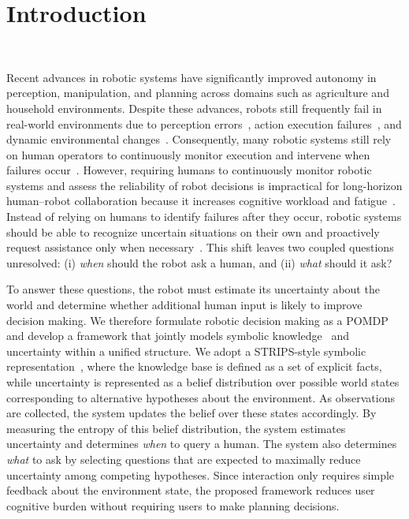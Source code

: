 \section{Introduction}~\label{sec:introduction}

Recent advances in robotic systems have significantly improved autonomy in perception, manipulation, and planning across domains such as agriculture and household environments. Despite these advances, robots still frequently fail in real-world environments due to perception errors~\cite{kaipa2016addressing}, action execution failures~\cite{kaelbling1998planning}, and dynamic environmental changes~\cite{kurniawati2016online}. Consequently, many robotic systems still rely on human operators to continuously monitor execution and intervene when failures occur~\cite{dragan2013legibility,goodrich2008human}. However, requiring humans to continuously monitor robotic systems and assess the reliability of robot decisions is impractical for long-horizon human--robot collaboration because it increases cognitive workload and fatigue~\cite{chen2014human}. Instead of relying on humans to identify failures after they occur, robotic systems should be able to recognize uncertain situations on their own and proactively request assistance only when necessary~\cite{sadigh2017active,leusmann2023understanding}. This shift leaves two coupled questions unresolved: (i) \textit{when} should the robot ask a human, and (ii) \textit{what} should it ask?

To answer these questions, the robot must estimate its uncertainty about the world and determine whether additional human input is likely to improve decision making. We therefore formulate robotic decision making as a POMDP~\cite{kaelbling1998planning} and develop a framework that jointly models symbolic knowledge~\cite{davis1993knowledge} and uncertainty within a unified structure. We adopt a STRIPS-style symbolic representation~\cite{fikes1971strips}, where the knowledge base is defined as a set of explicit facts, while uncertainty is represented as a belief distribution over possible world states corresponding to alternative hypotheses about the environment. As observations are collected, the system updates the belief over these states accordingly. By measuring the entropy of this belief distribution, the system estimates uncertainty and determines \textit{when} to query a human. The system also determines \textit{what} to ask by selecting questions that are expected to maximally reduce uncertainty among competing hypotheses. Since interaction only requires simple feedback about the environment state, the proposed framework reduces user cognitive burden without requiring users to make planning decisions.

